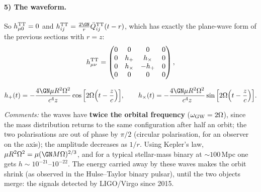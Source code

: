 \paragraph{5) The waveform.} So $h^{\rm TT}_{\mu0}=0$ and $h^{\rm TT}_{ij}=\frac{2\GN}{r}\ddot Q^{\rm TT}_{ij}(t-r)$, which has exactly the plane-wave form of the previous sections with $r=z$:
\begin{equation}
  h^{\rm TT}_{\mu\nu}=\begin{pmatrix}0&0&0&0\\0&h_+&h_\times&0\\0&h_\times&-h_+&0\\0&0&0&0\end{pmatrix},
\end{equation}
\begin{keyresult}
\begin{equation}
  h_+(t)=-\frac{4\GN\mu R^2\Omega^2}{c^4z}\cos\Big[2\Omega\Big(t-\frac zc\Big)\Big],\qquad
  h_\times(t)=-\frac{4\GN\mu R^2\Omega^2}{c^4z}\sin\Big[2\Omega\Big(t-\frac zc\Big)\Big].
\end{equation}
\end{keyresult}
\textit{Comments:} the waves have \textbf{twice the orbital frequency} ($\omega_{\rm GW}=2\Omega$), since the mass distribution returns to the same configuration after half an orbit; the two polarisations are out of phase by $\pi/2$ (circular polarisation, for an observer on the axis); the amplitude decreases as $1/r$. Using Kepler's law, $\mu R^2\Omega^2=\mu(\GN M\Omega)^{2/3}$, and for a typical stellar-mass binary at $\sim100$\,Mpc one gets $h\sim10^{-21}$--$10^{-22}$. The energy carried away by these waves makes the orbit shrink (as observed in the Hulse--Taylor binary pulsar), until the two objects merge: the signals detected by LIGO/Virgo since 2015.
